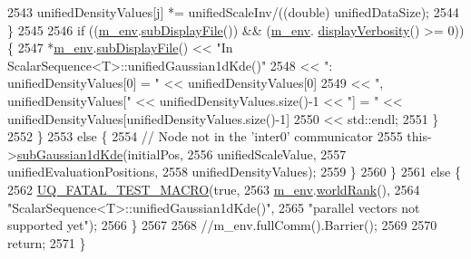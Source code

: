 \begin{DoxyCode}
2543         unifiedDensityValues[j] *= unifiedScaleInv/((double) unifiedDataSize);
2544       \}
2545 
2546       \textcolor{keywordflow}{if} ((\hyperlink{class_q_u_e_s_o_1_1_scalar_sequence_a71618cd6351b29361b437af68447a4c8}{m\_env}.\hyperlink{class_q_u_e_s_o_1_1_base_environment_a8a0064746ae8dddfece4229b9ad374d6}{subDisplayFile}()) && (\hyperlink{class_q_u_e_s_o_1_1_scalar_sequence_a71618cd6351b29361b437af68447a4c8}{m\_env}.
      \hyperlink{class_q_u_e_s_o_1_1_base_environment_a1fe5f244fc0316a0ab3e37463f108b96}{displayVerbosity}() >= 0)) \{
2547         *\hyperlink{class_q_u_e_s_o_1_1_scalar_sequence_a71618cd6351b29361b437af68447a4c8}{m\_env}.\hyperlink{class_q_u_e_s_o_1_1_base_environment_a8a0064746ae8dddfece4229b9ad374d6}{subDisplayFile}() << \textcolor{stringliteral}{"In ScalarSequence<T>::unifiedGaussian1dKde()"}
2548                                 << \textcolor{stringliteral}{": unifiedDensityValues[0] = "}                                       << 
      unifiedDensityValues[0]
2549                                 << \textcolor{stringliteral}{", unifiedDensityValues["} << unifiedDensityValues.size()-1 << \textcolor{stringliteral}{"] = "} << 
      unifiedDensityValues[unifiedDensityValues.size()-1]
2550                                 << std::endl;
2551       \}
2552     \}
2553     \textcolor{keywordflow}{else} \{
2554       \textcolor{comment}{// Node not in the 'inter0' communicator}
2555       this->\hyperlink{class_q_u_e_s_o_1_1_scalar_sequence_af16ce4767da1bfe61f40652d3fb6d418}{subGaussian1dKde}(initialPos,
2556                              unifiedScaleValue,
2557                              unifiedEvaluationPositions,
2558                              unifiedDensityValues);
2559     \}
2560   \}
2561   \textcolor{keywordflow}{else} \{
2562     \hyperlink{_defines_8h_a56d63d18d0a6d45757de47fcc06f574d}{UQ\_FATAL\_TEST\_MACRO}(\textcolor{keyword}{true},
2563                         \hyperlink{class_q_u_e_s_o_1_1_scalar_sequence_a71618cd6351b29361b437af68447a4c8}{m\_env}.\hyperlink{class_q_u_e_s_o_1_1_base_environment_a78b57112bbd0e6dd0e8afec00b40ffa7}{worldRank}(),
2564                         \textcolor{stringliteral}{"ScalarSequence<T>::unifiedGaussian1dKde()"},
2565                         \textcolor{stringliteral}{"parallel vectors not supported yet"});
2566   \}
2567 
2568   \textcolor{comment}{//m\_env.fullComm().Barrier();}
2569 
2570   \textcolor{keywordflow}{return};
2571 \}
\end{DoxyCode}
